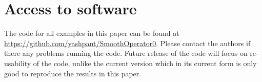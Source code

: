 \section{Access to software}
\label{sec:open access}
The code for all examples in this paper can be found at \protect\url{https://github.com/yashpant/SmoothOperator0}. Please contact the authors if there any problems running the code. Future release of the code will focus on re-usability of the code, unlike the current version which in its current form is only good to reproduce the results in this paper.